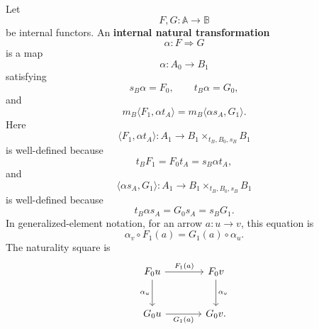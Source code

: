 \begin{definition}
\label{def:internal-natural-transformation}
    Let
    \[
        F,G:\mathbb A\to\mathbb B
    \]
    be internal functors. An \textbf{internal natural transformation}
    \[
        \alpha:F\Rightarrow G
    \]
    is a map
    \[
        \alpha:A_0\to B_1
    \]
    satisfying
    \[
        s_B\alpha=F_0,
        \qquad
        t_B\alpha=G_0,
    \]
        and
    \[
        m_B\langle F_1,\alpha t_A\rangle
        =
        m_B\langle \alpha s_A,G_1\rangle.
    \]
    Here
    \[
        \langle F_1,\alpha t_A\rangle:
        A_1\to B_1\times_{t_B,B_0,s_B}B_1
    \]
    is well-defined because
    \[
        t_BF_1=F_0t_A=s_B\alpha t_A,
    \]
    and
    \[
        \langle \alpha s_A,G_1\rangle:
        A_1\to B_1\times_{t_B,B_0,s_B}B_1
    \]
    is well-defined because
    \[
        t_B\alpha s_A=G_0s_A=s_BG_1.
    \]
    In generalized-element notation, for an arrow \(a:u\to v\), this equation
    is
    \[
        \alpha_v\circ F_1(a)
        =
        G_1(a)\circ \alpha_u.
    \]
    The naturality square is
    \[
        \begin{tikzcd}[column sep=large, row sep=large]
                F_0u
                    \arrow[r, "F_1(a)"]
                    \arrow[d, "\alpha_u"']
            &
                F_0v
                    \arrow[d, "\alpha_v"]
            \\
                G_0u
                    \arrow[r, "G_1(a)"']
            &
                G_0v.
        \end{tikzcd}
    \]
\end{definition}

